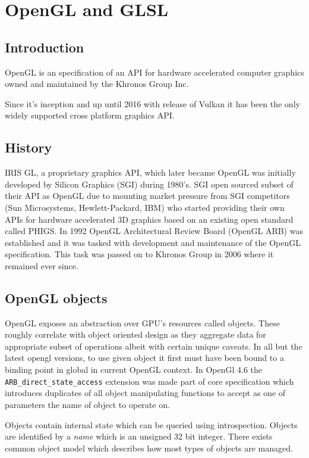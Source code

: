 \chapter{OpenGL and GLSL}

\section{Introduction}

OpenGL is an specification of an API for hardware accelerated computer graphics owned and maintained by the Khronos Group Inc.

Since it's inception  and up until 2016 with release of Vulkan it has been the only widely supported cross platform graphics API.

\section{History}

IRIS GL, a proprietary graphics API, which later became OpenGL was initially developed by Silicon Graphics (SGI) during 1980's. SGI open sourced subset of their API as OpenGL due to mounting market pressure from SGI competitors (Sun Microsystems, Hewlett-Packard, IBM) who started providing their own APIs for hardware accelerated 3D graphics based on an existing open standard called PHIGS.
In 1992 OpenGL Architectural Review Board (OpenGL ARB) was established and it was tasked with development and maintenance of the OpenGL specification. This task was passed on to Khronos Group in 2006 where it remained ever since.

\section{OpenGL objects}

OpenGL exposes an abstraction over GPU's resources called objects.
These roughly correlate with object oriented design as they aggregate data for appropriate subset of operations albeit with certain unique caveats.
In all but the latest opengl versions, to use given object it first must have been bound to a binding point in global in current OpenGL context.
In OpenGl 4.6 the \texttt{ARB\_direct\_state\_access} extension was made part of core specification which introduces duplicates of all object manipulating functions to 
accept as one of parameters the name of object to operate on.

Objects contain internal state which can be queried using introspection. 
Objects are identified by a \textit{name} which is an unsigned 32 bit integer. 
There exists common object model which describes how most types of objects are managed.

